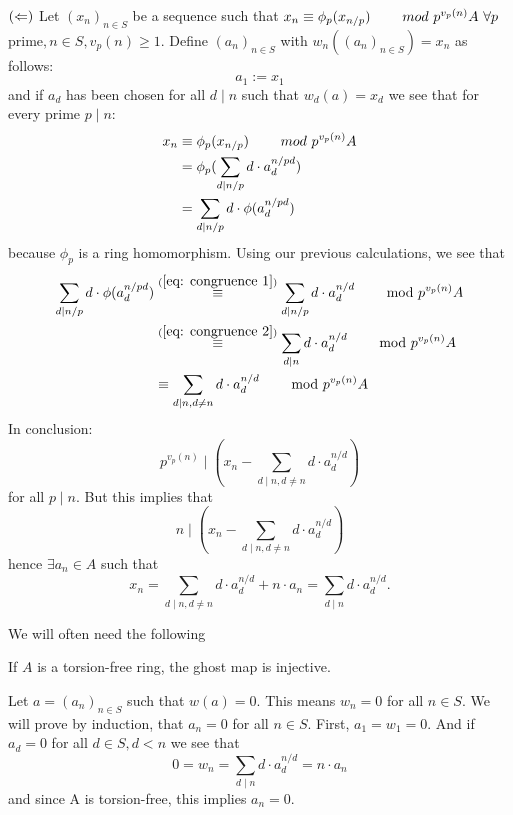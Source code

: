 \begin{bigproof}
    $(\Leftarrow)$ Let $(x_n)_{n \in S}$ be a sequence such that 
    $x_n \equiv \phi_p(x_{n/p}) \hskip8mm mod \ p^{v_p(n)}A \ \forall p\ $prime$, n\in S, v_p(n) \geqslant 1.$
    Define $(a_n)_{n \in S}$ with $w_n((a_n)_{n \in S}) = x_n$ as follows:
    \[a_1 := x_1\]
    and if $a_d$ has been chosen for all $d \mid n$ such that $w_d(a) = x_d$ we see that
    for every prime $p \mid n$:
    \begin{align*}
            x_n &\equiv \phi_p(x_{n/p}) \hskip8mm mod \ p^{v_p(n)}A \\
                &= \phi_p(\sum_{d \mid n/p} d \cdot a_d^{n/pd}) \\
                &= \sum_{d \mid n/p} d \cdot \phi(a_d^{n/pd})
    \end{align*}
    because $\phi_p$ is a ring homomorphism. Using our previous calculations,
    we see that
    \begin{align*}
        \sum_{d \mid n/p} d \cdot \phi(a_d^{n/pd})
        &\overset{(\ref{eq: congruence 1})}{\equiv} \sum_{d \mid n/p} d \cdot a_d^{n/d} 
        \text{\hskip8mm mod } p^{v_p(n)}A \\
        &\overset{(\ref{eq: congruence 2})}{\equiv} \sum_{d \mid n} d \cdot a_d^{n/d} 
        \text{\hskip8mm mod } p^{v_p(n)}A \\
        &\equiv \sum_{d \mid n,d \neq n} d \cdot a_d^{n/d} 
        \text{\hskip8mm mod } p^{v_p(n)}A
    \end{align*}
    In conclusion: 
    \[
    p^{v_p(n)} \mid \left( x_n - \sum_{d \mid n,d \neq n} d \cdot a_d^{n/d} \right)
    \]
    for all $p \mid n$. But this implies that 
    \[
        n \mid \left( x_n - \sum_{d \mid n,d \neq n} d \cdot a_d^{n/d} \right)
    \]
    hence $\exists a_n \in A$ such that 
    \[
        x_n = \sum_{d \mid n,d \neq n} d \cdot a_d^{n/d} + n \cdot a_n
        = \sum_{d \mid n} d \cdot a_d^{n/d}.
    \]
\end{bigproof}
We will often need the following
\begin{lemma} \label{lem: injective ghost map}
    If $A$ is a torsion-free ring, the ghost map is injective.
\end{lemma}
\begin{beweis}
    Let $a = (a_n)_{n \in S}$ such that $w(a) = 0$. This means
    $w_n = 0$ for all $n \in S$. We will prove by induction,
    that $a_n = 0$ for all $n \in S$. First, $a_1 = w_1 = 0$.
    And if $a_d = 0$ for all $d \in S, d < n$ we see that
    \[
        0 = w_n = \sum_{d \mid n} d \cdot a_d^{n/d} = n \cdot a_n 
    \]
    and since A is torsion-free, this implies $a_n = 0$.
\end{beweis}
